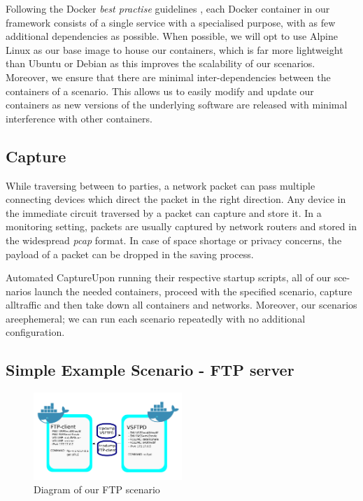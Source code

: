 \documentclass[sigconf,anonymous]{acmart}\usepackage[]{graphicx}\usepackage[]{color}
\begin{document}
Following the Docker \textit{best practise} guidelines \cite{bestpractise}, each Docker container in our framework consists of a single service with a specialised purpose, with as few additional dependencies as possible. When possible, we will opt to use Alpine Linux as our base image to house our containers, which is far more lightweight than Ubuntu or Debian as this improves the scalability of our scenarios. Moreover, we ensure that there are minimal inter-dependencies between the containers of a scenario. This allows us to easily modify and update our containers as new versions of the underlying software are released with minimal interference with other containers.



\subsection{Capture}

While traversing between to parties, a network packet can pass multiple connecting devices which direct the packet in the right direction. Any device in the immediate circuit traversed by a packet can capture and store it. In a monitoring setting, packets are usually captured by network routers and stored in the widespread \textit{pcap} format. In case of space shortage or privacy concerns, the payload of a packet can be dropped in the saving process.

Automated CaptureUpon running their respective startup scripts,  all of our sce-narios launch the needed containers, proceed with the specified scenario, capture alltraffic and then take down all containers and networks.  Moreover, our scenarios areephemeral; we can run each scenario repeatedly with no additional configuration.
  


\subsection{Simple Example Scenario - FTP server}
\begin{figure}[h!]
\centering
\includegraphics[width=0.50\textwidth]{images/ftp_example.png}
\caption{Diagram of our FTP scenario}
\end{figure}
\end{document}
